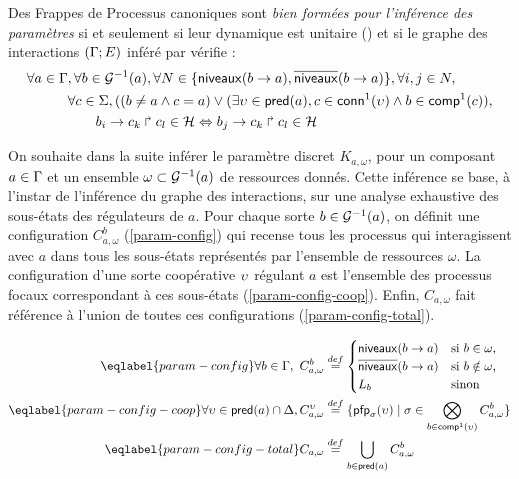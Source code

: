 \begin{critere}
  Des Frappes de Processus canoniques sont \emph{bien formées pour l'inférence des paramètres}
  si et seulement si leur dynamique est unitaire ()
  et si le graphe des interactions $(\mathrm{\Gamma}; E)$ inféré par 
  vérifie :
  \begin{align*}
    \begin{split}
      \forall a \in \mathrm{\Gamma} &, \forall b \in \mathcal{G}^{-1}(a),
        \forall N \in \{ \mathsf{niveaux}(b\rightarrow a), \overline{\mathsf{niveaux}}(b\rightarrow a) \}, \forall i,j \in N, \\
      & \forall c \in \Sigma, ( (b \neq a \wedge c = a) \vee
        (\exists \upsilon \in \mathsf{pred}(a), c \in \mathsf{conn}^1(\upsilon) \wedge b \in \mathsf{comp}^1(c)), \\
      & \qquad b_i\rightarrow c_k\Rsh c_l\in\mathcal{H} \Leftrightarrow b_j\rightarrow c_k\Rsh c_l\in\mathcal{H}
    \end{split}
  \end{align*}
\end{critere}

On souhaite dans la suite inférer le paramètre discret $K_{a,\omega}$,
pour un composant $a \in \mathrm{\Gamma}$ et un ensemble $\omega \subset \mathcal{G}^{-1}(a)$
de ressources donnés.
Cette inférence se base, à l'instar de l'inférence du graphe des interactions, sur une analyse
exhaustive des sous-états des régulateurs de $a$.
Pour chaque sorte $b \in \mathcal{G}^{-1}(a)$, on définit une configuration $C^b_{a,\omega}$
(\eqref{param-config}) qui recense tous les processus qui interagissent avec $a$
dans tous les sous-états représentés par l'ensemble de ressources $\omega$.
La configuration d'une sorte coopérative $\upsilon$ régulant $a$ est l'ensemble des processus
focaux correspondant à ces sous-états (\eqref{param-config-coop}).
Enfin, $C_{a,\omega}$ fait référence à l'union de toutes ces configurations
(\eqref{param-config-total}).

\begin{align}
\eqlabel{param-config}
  \forall b \in \components,~
  C_{a,\omega}^b & \DEF \begin{cases}
    \levels{b}{a}  & \text{si $b \in \omega$,}\\
    \ulevels{b}{a} & \text{si $b \notin \omega$,}\\
    L_b            & \text{sinon}\\
  \end{cases}
  \\
\eqlabel{param-config-coop}
  \forall \myupsilon \in \pred(a) \cap \cs,
    C_{a,\omega}^\myupsilon & \DEF \{ \pfp_{\sigma}(\myupsilon) \mid
    \sigma \in \bigtimes{b \in \compin(\myupsilon)} C_{a,\omega}^b \} \\
\eqlabel{param-config-total}
  C_{a,\omega} & \DEF \bigcup_{b \in \pred(a)} C^b_{a,\omega}
\end{align}

